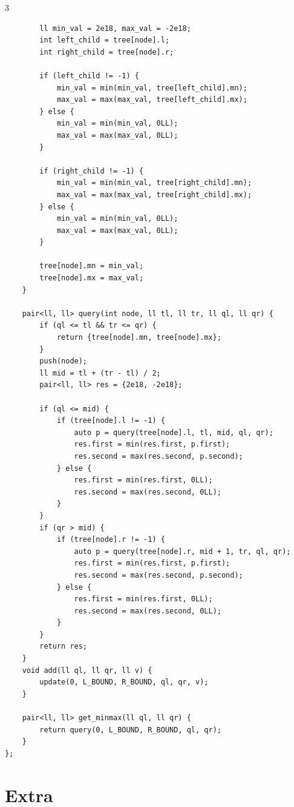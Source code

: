 \documentclass[9pt, a4paper, notitlepage]{extreport}
\begin{document}
\begin{multicols}{3}
\begin{verbatim}
        ll min_val = 2e18, max_val = -2e18;
        int left_child = tree[node].l;
        int right_child = tree[node].r;
        
        if (left_child != -1) {
            min_val = min(min_val, tree[left_child].mn);
            max_val = max(max_val, tree[left_child].mx);
        } else {
            min_val = min(min_val, 0LL);
            max_val = max(max_val, 0LL);
        }
        
        if (right_child != -1) {
            min_val = min(min_val, tree[right_child].mn);
            max_val = max(max_val, tree[right_child].mx);
        } else {
            min_val = min(min_val, 0LL);
            max_val = max(max_val, 0LL);
        }
        
        tree[node].mn = min_val;
        tree[node].mx = max_val;
    }
 
    pair<ll, ll> query(int node, ll tl, ll tr, ll ql, ll qr) {
        if (ql <= tl && tr <= qr) {
            return {tree[node].mn, tree[node].mx};
        }
        push(node);
        ll mid = tl + (tr - tl) / 2;
        pair<ll, ll> res = {2e18, -2e18};
        
        if (ql <= mid) {
            if (tree[node].l != -1) {
                auto p = query(tree[node].l, tl, mid, ql, qr);
                res.first = min(res.first, p.first);
                res.second = max(res.second, p.second);
            } else {
                res.first = min(res.first, 0LL);
                res.second = max(res.second, 0LL);
            }
        }
        if (qr > mid) {
            if (tree[node].r != -1) {
                auto p = query(tree[node].r, mid + 1, tr, ql, qr);
                res.first = min(res.first, p.first);
                res.second = max(res.second, p.second);
            } else {
                res.first = min(res.first, 0LL);
                res.second = max(res.second, 0LL);
            }
        }
        return res;
    }
    void add(ll ql, ll qr, ll v) {
        update(0, L_BOUND, R_BOUND, ql, qr, v);
    }
 
    pair<ll, ll> get_minmax(ll ql, ll qr) {
        return query(0, L_BOUND, R_BOUND, ql, qr);
    }
};
\end{verbatim}



%
%

\section{Extra}


\end{multicols}
\end{document}

